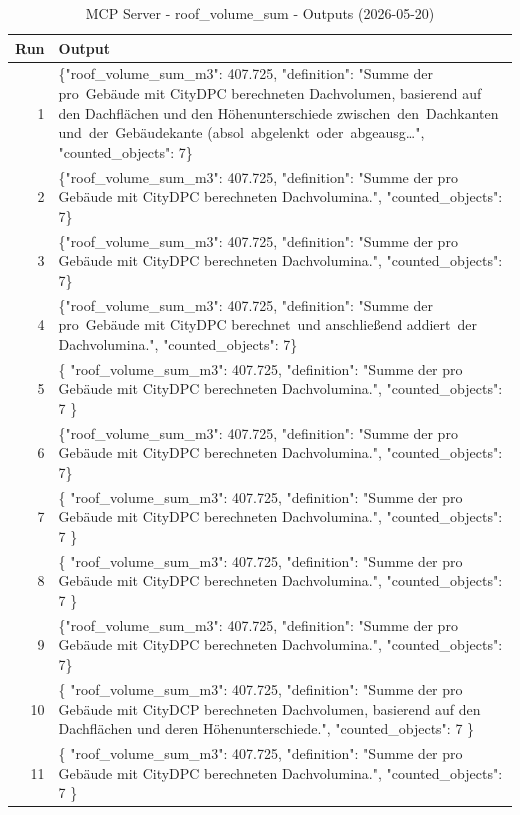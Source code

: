 \documentclass[a4paper,11pt]{article}
\begin{document}
\begin{table}[ht]
\centering
\scriptsize
\caption{MCP Server - roof\_volume\_sum - Outputs (2026-05-20)}
\label{tab:mcp\_roof\_volume\_sum\_outputs\_2026-05-20}
\begin{tabular}{r p{12cm}}
\hline
Run & Output \\
\hline
1 & \{"roof\_volume\_sum\_m3": 407.725, "definition": "Summe der pro Gebäude mit CityDPC berechnet­en Dachvolumen, basierend auf den Dachflächen und den Höhenunterschiede zwischen den Dachkanten und der Gebäudekante (absol abgelenkt oder abge­ausg…", "counted\_objects": 7\} \\
2 & \{"roof\_volume\_sum\_m3": 407.725, "definition": "Summe der pro Gebäude mit CityDPC berechneten Dachvolumina.", "counted\_objects": 7\} \\
3 & \{"roof\_volume\_sum\_m3": 407.725, "definition": "Summe der pro Gebäude mit CityDPC berechneten Dachvolumina.", "counted\_objects": 7\} \\
4 & \{"roof\_volume\_sum\_m3": 407.725, "definition": "Summe der pro Gebäude mit CityDPC berechnet und anschließend addiert der Dachvolumina.", "counted\_objects": 7\} \\
5 & \{
  "roof\_volume\_sum\_m3": 407.725,
  "definition": "Summe der pro Gebäude mit CityDPC berechneten Dachvolumina.",
  "counted\_objects": 7
\} \\
6 & \{"roof\_volume\_sum\_m3": 407.725, "definition": "Summe der pro Gebäude mit CityDPC berechneten Dachvolumina.", "counted\_objects": 7\} \\
7 & \{
  "roof\_volume\_sum\_m3": 407.725,
  "definition": "Summe der pro Gebäude mit CityDPC berechneten Dachvolumina.",
  "counted\_objects": 7
\} \\
8 & \{
  "roof\_volume\_sum\_m3": 407.725,
  "definition": "Summe der pro Gebäude mit CityDPC berechneten Dachvolumina.",
  "counted\_objects": 7
\} \\
9 & \{"roof\_volume\_sum\_m3": 407.725, "definition": "Summe der pro Gebäude mit CityDPC berechneten Dachvolumina.", "counted\_objects": 7\} \\
10 & \{
  "roof\_volume\_sum\_m3": 407.725,
  "definition": "Summe der pro Gebäude mit CityDCP berechneten Dachvolumen, basierend auf den Dachflächen und deren Höhenunterschiede.",
  "counted\_objects": 7
\} \\
11 & \{
  "roof\_volume\_sum\_m3": 407.725,
  "definition": "Summe der pro Gebäude mit CityDPC berechneten Dachvolumina.",
  "counted\_objects": 7
\} \\

\end{tabular}
\end{table}
\end{document}
